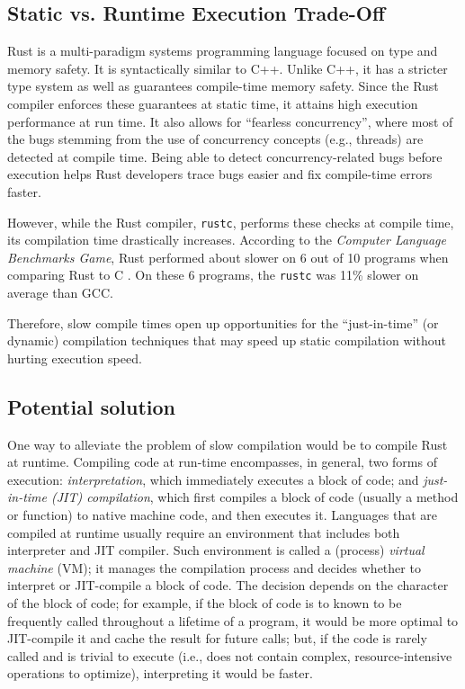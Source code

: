 
\subsection{Static vs. Runtime Execution Trade-Off}
Rust is a multi-paradigm systems programming language focused on type and
memory safety.  It is syntactically similar to C++. Unlike C++, it has a
stricter type system as well as guarantees compile-time memory safety. Since
the Rust compiler enforces these guarantees at static time, it attains high
execution performance at run time. It also allows for ``fearless concurrency'',
where most of the bugs stemming from the use of concurrency concepts (e.g.,
threads) are detected at compile time. Being able to detect concurrency-related
bugs before execution helps Rust developers trace bugs easier and fix 
compile-time errors faster.


However, while the Rust compiler, \texttt{rustc}, performs these checks at
compile time, its compilation time drastically increases. According to the
\textit{Computer Language Benchmarks Game}, Rust performed about slower on 6
out of 10 programs when comparing Rust to C \cite{rustbench}. On these 6
programs, the \texttt{rustc} was 11\% slower on average than GCC.

Therefore, slow compile times open up opportunities for the ``just-in-time''
(or dynamic) compilation techniques that may speed up static compilation
without hurting execution speed.

\subsection{Potential solution}


One way to alleviate the problem of slow compilation would be to compile
Rust at runtime. Compiling code at run-time encompasses, in general, two forms
of execution: \textit{interpretation}, which immediately executes a block of code;
and \textit{just-in-time (JIT) compilation}, which first compiles a block of code
(usually a method or function) to native machine code, and then executes it.
Languages that are compiled at runtime usually require an environment
that includes both interpreter and JIT compiler. Such environment is
called a (process) \textit{virtual machine} (VM); it manages
the compilation process and decides whether to interpret or JIT-compile
a block of code. The decision depends on the character of the block of code; 
for example, if the block of code is to known to be
frequently called throughout a lifetime of a program, it would be more
optimal to JIT-compile it and cache the result for future calls; but,
if the code is rarely called and is trivial to execute (i.e., does not
contain complex, resource-intensive operations to optimize), interpreting it
would be faster.

